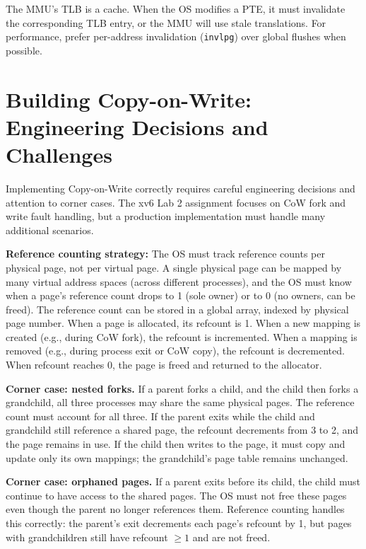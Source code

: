 \documentclass[11pt]{article}
\begin{document}
\begin{keyidea}
The MMU's TLB is a cache. When the OS modifies a PTE, it must invalidate the corresponding TLB entry, or the MMU will use stale translations. For performance, prefer per-address invalidation (\texttt{invlpg}) over global flushes when possible.
\end{keyidea}

\section{Building Copy-on-Write: Engineering Decisions and Challenges}

Implementing Copy-on-Write correctly requires careful engineering decisions and attention to corner cases. The xv6 Lab 2 assignment focuses on CoW fork and write fault handling, but a production implementation must handle many additional scenarios.

\textbf{Reference counting strategy:} The OS must track reference counts per physical page, not per virtual page. A single physical page can be mapped by many virtual address spaces (across different processes), and the OS must know when a page's reference count drops to 1 (sole owner) or to 0 (no owners, can be freed). The reference count can be stored in a global array, indexed by physical page number. When a page is allocated, its refcount is 1. When a new mapping is created (e.g., during CoW fork), the refcount is incremented. When a mapping is removed (e.g., during process exit or CoW copy), the refcount is decremented. When refcount reaches 0, the page is freed and returned to the allocator.

\textbf{Corner case: nested forks.} If a parent forks a child, and the child then forks a grandchild, all three processes may share the same physical pages. The reference count must account for all three. If the parent exits while the child and grandchild still reference a shared page, the refcount decrements from 3 to 2, and the page remains in use. If the child then writes to the page, it must copy and update only its own mappings; the grandchild's page table remains unchanged.

\textbf{Corner case: orphaned pages.} If a parent exits before its child, the child must continue to have access to the shared pages. The OS must not free these pages even though the parent no longer references them. Reference counting handles this correctly: the parent's exit decrements each page's refcount by 1, but pages with grandchildren still have refcount $\geq 1$ and are not freed.
\end{document}
